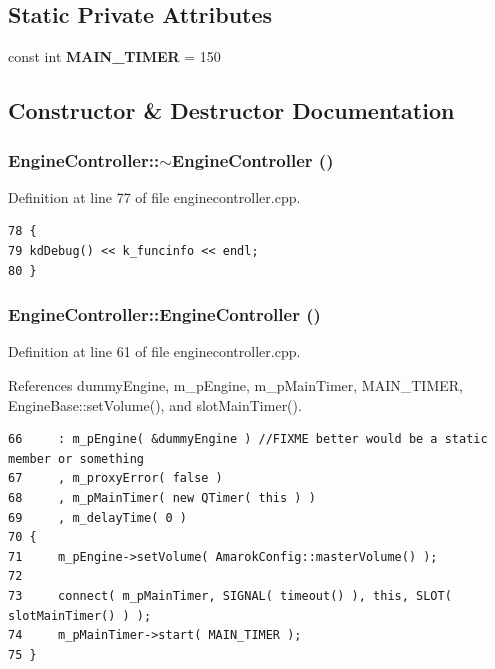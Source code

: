 \subsection*{Static Private Attributes}
\begin{CompactItemize}
\item 
const int {\bf MAIN\_\-TIMER} = 150
\end{CompactItemize}


\subsection{Constructor \& Destructor Documentation}
\subsubsection{\setlength{\rightskip}{0pt plus 5cm}Engine\-Controller::$\sim${\bf Engine\-Controller} ()\hspace{0.3cm}{\tt  [virtual]}}\label{classEngineController_EngineControllera0}




Definition at line 77 of file enginecontroller.cpp.



\footnotesize\begin{verbatim}78 {
79 kdDebug() << k_funcinfo << endl;
80 }
\end{verbatim}\normalsize 
{}
\subsubsection{\setlength{\rightskip}{0pt plus 5cm}Engine\-Controller::Engine\-Controller ()\hspace{0.3cm}{\tt  [private]}}\label{classEngineController_EngineControllerd0}




Definition at line 61 of file enginecontroller.cpp.

References dummy\-Engine, m\_\-p\-Engine, m\_\-p\-Main\-Timer, MAIN\_\-TIMER, Engine\-Base::set\-Volume(), and slot\-Main\-Timer().



\footnotesize\begin{verbatim}66     : m_pEngine( &dummyEngine ) //FIXME better would be a static member or something
67     , m_proxyError( false )
68     , m_pMainTimer( new QTimer( this ) )
69     , m_delayTime( 0 )
70 {
71     m_pEngine->setVolume( AmarokConfig::masterVolume() );
72 
73     connect( m_pMainTimer, SIGNAL( timeout() ), this, SLOT( slotMainTimer() ) );
74     m_pMainTimer->start( MAIN_TIMER );
75 }
\end{verbatim}\normalsize 


